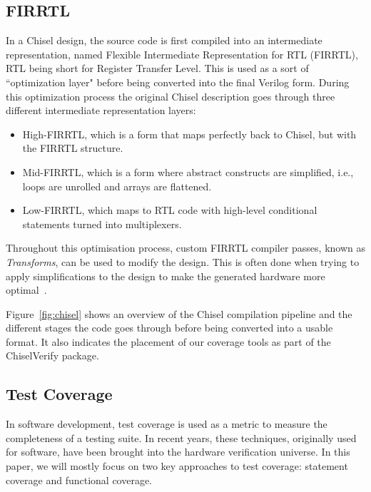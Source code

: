 \documentclass[conference]{IEEEtran}
\begin{document}
\subsection{FIRRTL}
In a Chisel design, the source code is first compiled into an intermediate representation, named Flexible Intermediate Representation for RTL (FIRRTL), RTL being short for Register Transfer Level.
This is used as a sort of ``optimization layer" before being converted into the final Verilog form. 
During this optimization process the original Chisel description goes through three different intermediate representation layers:
\begin{itemize}
\item High-FIRRTL, which is a form that maps perfectly back to Chisel, but with the FIRRTL structure.
\item Mid-FIRRTL, which is a form where abstract constructs are simplified, i.e., loops are unrolled and arrays are flattened.
\item Low-FIRRTL, which maps to RTL code with high-level conditional statements turned into multiplexers.
\end{itemize}
Throughout this optimisation process, custom FIRRTL compiler passes, known as \textit{Transforms}, can be used to modify the design. 
This is often done when trying to apply simplifications to the design to make the generated hardware more optimal~\cite{firrtl}.  

Figure~\ref{fig:chisel} shows an overview of the Chisel compilation pipeline and the different stages the code goes through before being converted into a usable format. It also indicates the placement of our coverage tools as part of the ChiselVerify package.

\subsection{Test Coverage}
In software development, test coverage is used as a metric to measure the completeness of a testing suite. 
In recent years, these techniques, originally used for software, have been brought into the hardware verification universe. 
In this paper, we will mostly focus on two key approaches to test coverage: statement coverage and functional coverage. 
\end{document}
